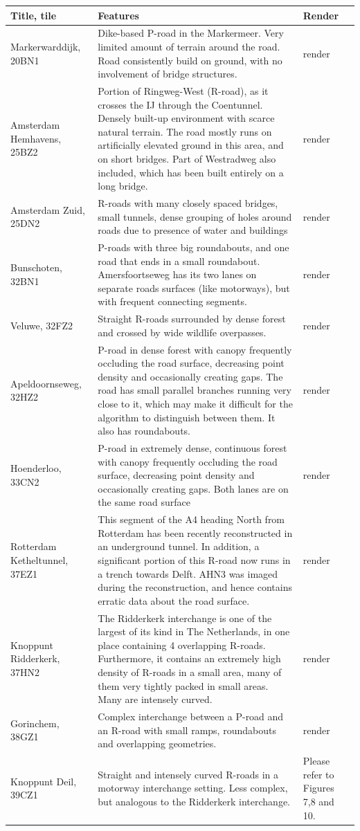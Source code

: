 \begin{table}[]
\begin{tabular}{@{}p{2.6cm}p{7cm}p{6cm}@{}}
\toprule
Title, tile  & Features & Render \\ \midrule
Markerwarddijk, 20BN1 & Dike-based P-road in the Markermeer. Very limited amount of terrain around the road. Road consistently build on ground, with no involvement of bridge structures. & render \\
Amsterdam Hemhavens, 25BZ2 & Portion of Ringweg-West (R-road), as it crosses the IJ through the Coentunnel. Densely built-up environment with scarce natural terrain. The road mostly runs on artificially elevated ground in this area, and on short bridges. Part of Westradweg also included, which has been built entirely on a long bridge. & render \\
Amsterdam Zuid, 25DN2 & R-roads with many closely spaced bridges, small tunnels, dense grouping of holes around roads due to presence of water and buildings & render \\
Bunschoten, 32BN1 & P-roads with three big roundabouts, and one road that ends in a small roundabout. Amersfoortseweg has its two lanes on separate roads surfaces (like motorways), but with frequent connecting segments. & render \\
Veluwe, 32FZ2 & Straight R-roads surrounded by dense forest and crossed by wide wildlife overpasses. & render \\
Apeldoornseweg, 32HZ2 & P-road in dense forest with canopy frequently occluding the road surface, decreasing point density and occasionally creating gaps. The road has small parallel branches running very close to it, which may make it difficult for the algorithm to distinguish between them. It also has roundabouts. & render \\
Hoenderloo, 33CN2 & P-road in extremely dense, continuous forest with canopy frequently occluding the road surface, decreasing point density and occasionally creating gaps. Both lanes are on the same road surface & render \\
Rotterdam Ketheltunnel, 37EZ1 & This segment of the A4 heading North from Rotterdam has been recently reconstructed in an underground tunnel. In addition, a significant portion of this R-road now runs in a trench towards Delft. AHN3 was imaged during the reconstruction, and hence contains erratic data about the road surface. & render \\
Knoppunt Ridderkerk, 37HN2 & The Ridderkerk interchange is one of the largest of its kind in The Netherlands, in one place containing 4 overlapping R-roads. Furthermore, it contains an extremely high density of R-roads in a small area, many of them very tightly packed in small areas. Many are intensely curved. & render \\
Gorinchem, 38GZ1 & Complex interchange between a P-road and an R-road with small ramps, roundabouts and overlapping geometries. & render \\
Knoppunt Deil, 39CZ1 & Straight and intensely curved R-roads in a motorway interchange setting. Less complex, but analogous to the Ridderkerk interchange. & Please refer to Figures 7,8 and 10.
\end{tabular}
\end{table}

